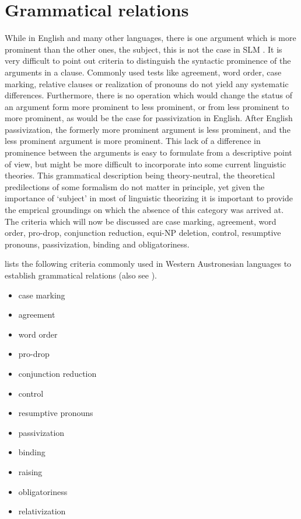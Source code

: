
\chapter{Grammatical relations}\label{sec:gramrel}
While in English and many other languages, there is one argument which is more prominent than the other ones, the subject, this is not the case in SLM \citep[cf.][16]{Ansaldo2005ms}. It is very difficult to point out criteria to distinguish the syntactic prominence of the arguments in a clause. Commonly used tests like agreement, word order, case marking, relative clauses or realization of pronouns do not yield any systematic differences. Furthermore, there is no operation  which would change the status of an argument form more prominent to less prominent, or from less prominent to more prominent, as would be the case for passivization in English. After English passivization, the formerly more prominent argument is less prominent, and the less prominent argument is more prominent.
This lack of a difference in prominence between the arguments is easy to formulate from a descriptive point of view, but might be more difficult to incorporate into some current linguistic theories. This grammatical description being theory-neutral, the theoretical predilections of some formalism do not matter in principle, yet given the importance of `subject' in most of linguistic theorizing it is important to provide the emprical groundings on which the absence of this category was arrived at. The criteria which will now be discussed are case marking, agreement, word order, pro-drop, conjunction reduction, equi-NP deletion, control, resumptive pronouns, passivization, binding and obligatoriness.


\kuckn
\citet[152]{Himmelmann2005typochar} lists the following criteria commonly used in Western Austronesian languages to establish grammatical relations (also see \citep{Schachter1995}).

\begin{itemize}
 \item case marking
 \item agreement
 \item word order
 \item pro-drop
 \item conjunction reduction
 \item control
 \item resumptive pronouns
 \item passivization
 \item binding
 \item raising
 \item obligatoriness
 \item relativization
\end{itemize}

